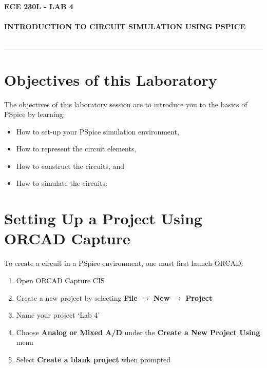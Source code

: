 \documentclass[12pt]{../manual}
\begin{document}
\begin{center}
\textbf{\huge ECE 230L - LAB 4}\\~\\
\textbf{\large INTRODUCTION TO CIRCUIT SIMULATION USING PSPICE}\\~\\
\rule{6.5in}{0.5mm}
\end{center}

\tableofcontents

\listoffigures

\newpage
%
\section{Objectives of this Laboratory}
The objectives of this laboratory session are to introduce you to the basics of PSpice by learning:
\begin{itemize}
\item How to set-up your PSpice simulation environment,
\item How to represent the circuit elements,
\item How to construct the circuits, and
\item How to simulate the circuits.
\end{itemize}
%
\section{Setting Up a Project Using ORCAD Capture}
To create a circuit in a PSpice environment, one must first launch ORCAD:
\begin{enumerate}
	\item Open ORCAD Capture CIS
	\item Create a new project by selecting {\bf File} $\to$ {\bf New} $\to$ {\bf Project}
	\item Name your project `Lab 4'
	\item Choose {\bf Analog or Mixed A/D} under the {\bf Create a New Project Using} menu
	\item Select {\bf Create a blank project} when prompted
\end{enumerate}
\end{document}
